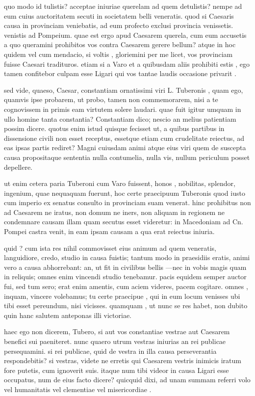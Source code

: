  quo modo id tulistis? acceptae iniuriae querelam ad quem detulistis? nempe ad eum cuius auctoritatem secuti in societatem belli veneratis. quod si Caesaris causa in provinciam veniebatis, ad eum profecto exclusi provincia venissetis. venistis ad Pompeium. quae est ergo apud Caesarem querela, cum eum accusetis a quo queramini prohibitos vos contra Caesarem gerere bellum? atque in hoc quidem vel cum mendacio, si voltis , gloriemini per me licet, vos provinciam fuisse Caesari tradituros. etiam si a Varo et a quibusdam aliis prohibiti estis , ego tamen confitebor culpam esse Ligari qui vos tantae laudis occasione privarit .

 sed vide, quaeso, Caesar, constantiam ornatissimi viri L. Tuberonis , quam ego, quamvis ipse probarem, ut probo, tamen non commemorarem, nisi a te cognovissem in primis eam virtutem solere laudari. quae fuit igitur umquam in ullo homine tanta constantia? Constantiam dico; nescio an melius patientiam possim dicere. quotus enim istud quisque fecisset ut, a quibus partibus in dissensione civili non esset receptus, essetque etiam cum crudelitate reiectus, ad eas ipsas partis rediret? Magni cuiusdam animi atque eius viri quem de suscepta causa propositaque sententia nulla contumelia, nulla vis, nullum periculum posset depellere.

 ut enim cetera paria Tuberoni cum Varo fuissent, honos , nobilitas, splendor, ingenium, quae nequaquam fuerunt, hoc certe praecipuum Tuberonis quod iusto cum imperio ex senatus consulto in provinciam suam venerat. hinc prohibitus non ad Caesarem ne iratus, non domum ne iners, non aliquam in regionem ne condemnare causam illam quam secutus esset videretur: in Macedoniam ad Cn. Pompei castra venit, in eam ipsam causam a qua erat reiectus iniuria.

 quid ? cum ista res nihil commovisset eius animum ad quem veneratis, languidiore, credo, studio in causa fuistis; tantum modo in praesidiis eratis, animi vero a causa abhorrebant: an, ut fit in civilibus bellis —nec in vobis magis quam in reliquis; omnes enim vincendi studio tenebamur. pacis equidem semper auctor fui, sed tum sero; erat enim amentis, cum aciem videres, pacem cogitare. omnes , inquam, vincere volebamus; tu certe praecipue , qui in eum locum venisses ubi tibi esset pereundum, nisi vicisses. quamquam , ut nunc se res habet, non dubito quin hanc salutem anteponas illi victoriae.

 haec ego non dicerem, Tubero, si aut vos constantiae vestrae aut Caesarem benefici sui paeniteret. nunc quaero utrum vestras iniurias an rei publicae persequamini. si rei publicae, quid de vestra in illa causa perseverantia respondebitis? si vestras, videte ne erretis qui Caesarem vestris inimicis iratum fore putetis, cum ignoverit suis. itaque num tibi videor in causa Ligari esse occupatus, num de eius facto dicere? quicquid dixi, ad unam summam referri volo vel humanitatis vel clementiae vel misericordiae .

